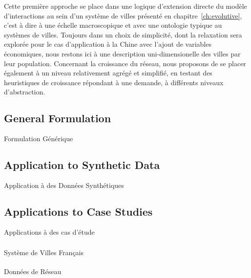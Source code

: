 Cette première approche se place dans une logique d'extension directe du modèle d'interactions au sein d'un système de villes présenté en chapitre~\autoref{ch:evolutive}, c'est à dire à une échelle macroscopique et avec une ontologie typique au systèmes de villes. Toujours dans un choix de simplicité, dont la relaxation sera explorée pour le cas d'application à la Chine avec l'ajout de variables économiques, nous restons ici à une description uni-dimensionelle des villes par leur population. Concernant la croissance du réseau, nous proposons de se placer également à un niveau relativement agrégé et simplifié, en testant des heuristiques de croissance répondant à une demande, à différents niveaux d'abstraction. 







\subsection{General Formulation}{Formulation Générique}








\subsection{Application to Synthetic Data}{Application à des Données Synthétiques}






\subsection[Applications][Applications]{Applications to Case Studies}{Applications à des cas d'étude}


\subsubsection{}{Système de Villes Français}

\paragraph{}{Données de Réseau}

